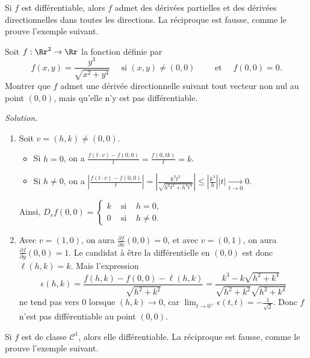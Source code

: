 \documentclass[11pt, class=report,crop=false]{standalone}
\begin{document}
\bigskip



Si $f$ est différentiable, alors $f$ admet des dérivées partielles et des dérivées directionnelles dans toutes les directions. La réciproque est fausse, comme le prouve l'exemple suivant.

\begin{exemple}
Soit $f:\Rr^2\to \Rr$ la fonction définie par
$$f(x,y)=\frac{y^3}{\sqrt{x^2+y^4}}\quad \text{ si }(x,y)\neq (0,0)\qquad \text{ et }\quad f(0,0)=0.$$
Montrer que $f$ admet une dérivée directionnelle suivant tout vecteur non nul au point $(0,0)$, mais qu'elle n'y est pas différentiable.


\bigskip
\emph{Solution.}

\begin{enumerate}
\item Soit $v=(h,k)\neq (0,0)$.
\begin{itemize}
  \item Si $h=0$, on a $\displaystyle \frac{f(t \cdot v)-f(0,0)}{t}=\frac{f(0,tk)}{t}=k$.
  \item Si $h\neq 0$, on a $\displaystyle \left\vert \frac{f(t\cdot v)-f(0,0)}{t}\right\vert= \left\vert \frac{k^3t^2}{\sqrt{h^2t^2+h^4t^4}}\right\vert \le \left\vert \frac{k^3}{h}\right\vert |t|\underset{t\to 0}{\longrightarrow} 0$.
\end{itemize}
Ainsi, $\displaystyle D_{v}f(0,0)=
\left\{
\begin{array}{ccc}
k&\text{ si }& h =0, \\ 
0&\text{ si }& h\neq 0. 
\end{array}\right.$


\item Avec $v=(1,0)$, on aura $\frac{\partial f}{\partial x}(0,0)=0$, et avec $v=(0,1)$, on aura $\frac{\partial f}{\partial y}(0,0)=1$. 
Le candidat à être la différentielle en $(0,0)$ est donc $\ell(h,k)  = k$.
Mais l'expression
$$\epsilon (h,k)=\frac{f(h,k)-f(0,0)-\ell(h,k)}{\sqrt{h^2+k^2}}=\frac{k^3-k\sqrt{h^2+k^4}}{\sqrt{h^2+k^2}\sqrt{h^2+k^4}}$$
ne tend pas vers $0$ lorsque $(h,k) \to 0$, car $\lim _{t\to 0^+}\epsilon (t,t)=-\frac{1}{\sqrt{2}}$. Donc $f$ n'est pas différentiable au point $(0,0)$. 
\end{enumerate}
\end{exemple}

\bigskip

Si $f$ est de classe $\mathcal{C}^1$, alors elle différentiable. La réciproque est fausse, comme le prouve l'exemple suivant.
\end{document}

